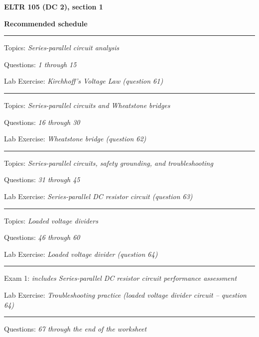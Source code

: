 
\centerline{\bf ELTR 105 (DC 2), section 1} \bigskip 
 
\vskip 10pt

\noindent
{\bf Recommended schedule}

\vskip 5pt

\hrule \vskip 5pt
\noindent
{}

\hskip 10pt Topics: {\it Series-parallel circuit analysis}
 
\hskip 10pt Questions: {\it 1 through 15}
 
\hskip 10pt Lab Exercise: {\it Kirchhoff's Voltage Law (question 61)}
 
\vskip 10pt
\hrule \vskip 5pt
\noindent
{}

\hskip 10pt Topics: {\it Series-parallel circuits and Wheatstone bridges}
 
\hskip 10pt Questions: {\it 16 through 30}
 
\hskip 10pt Lab Exercise: {\it Wheatstone bridge (question 62)}
 
\vskip 10pt
\hrule \vskip 5pt
\noindent
{}

\hskip 10pt Topics: {\it Series-parallel circuits, safety grounding, and troubleshooting}
 
\hskip 10pt Questions: {\it 31 through 45}
 
\hskip 10pt Lab Exercise: {\it Series-parallel DC resistor circuit (question 63)}
 
\vskip 10pt
\hrule \vskip 5pt
\noindent
{}

\hskip 10pt Topics: {\it Loaded voltage dividers}
 
\hskip 10pt Questions: {\it 46 through 60}
 
\hskip 10pt Lab Exercise: {\it Loaded voltage divider (question 64)}
 
\vskip 10pt
\hrule \vskip 5pt
\noindent
{}

\hskip 10pt Exam 1: {\it includes Series-parallel DC resistor circuit performance assessment}
 
\hskip 10pt Lab Exercise: {\it Troubleshooting practice (loaded voltage divider circuit -- question 64)}
 
\vskip 10pt
\hrule \vskip 5pt
\noindent
{}

\hskip 10pt Questions: {\it 67 through the end of the worksheet}
 
